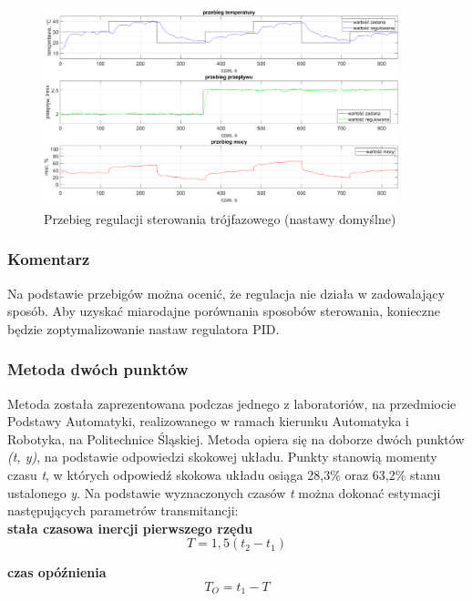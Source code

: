 \documentclass[a4paper,twoside,12pt]{book}
\begin{document}
\begin{figure}[h]
	\centering
	\includegraphics[width=0.92\textwidth]{./wykresy/png/regulation(default)ThreePhase.png}
	\caption{Przebieg regulacji sterowania trójfazowego (nastawy domyślne)}
	\label{fig:Trójfazowe domyślne}
\end{figure}

\subsubsection{Komentarz}
Na podstawie przebigów można ocenić, że regulacja nie działa w zadowalający sposób. Aby uzyskać miarodajne porównania sposobów sterowania, konieczne będzie zoptymalizowanie nastaw regulatora PID.

\newpage
\subsubsection{Metoda dwóch punktów}
Metoda została zaprezentowana podczas jednego z laboratoriów, na przedmiocie Podstawy Automatyki, realizowanego w ramach kierunku Automatyka i Robotyka, na Politechnice Śląskiej. Metoda opiera się na doborze dwóch punktów \textit{(t, y)}, na podstawie odpowiedzi skokowej układu. Punkty stanowią momenty czasu \textit{t}, w których odpowiedź skokowa układu osiąga 28,3\% oraz 63,2\% stanu ustalonego \textit{y}. Na podstawie wyznaczonych czasów \textit{t} można dokonać estymacji następujących parametrów transmitancji:\\

\textbf{stała czasowa inercji pierwszego rzędu}
\begin{equation}
	T = 1,5 (t_2 - t_1)
\end{equation}

\textbf{czas opóźnienia}
\begin{equation}
	T_O = t_1 - T
\end{equation}
\end{document}
